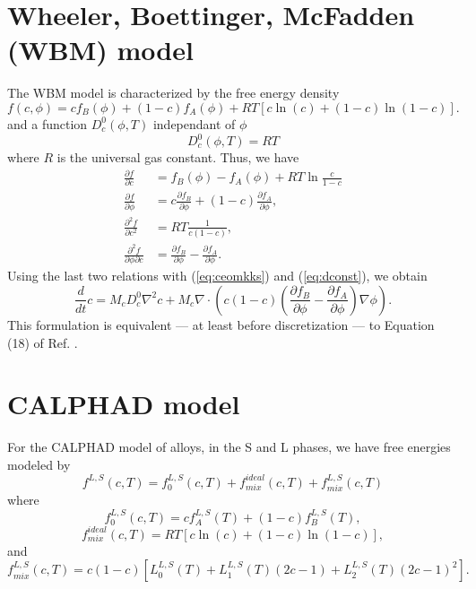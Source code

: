 %
\section{Wheeler, Boettinger, McFadden (WBM) model}

The WBM model \cite{PhysRevA.45.7424} is
characterized by the free energy density
%
\begin{equation}
  f(c,\phi)=c f_B(\phi)+(1-c)f_A(\phi)+RT[c
  \ln(c)+(1-c)\ln(1-c)].
\label{eq:fwbm}
\end{equation}
%
and a function $D_c^0(\phi,T)$ independant of $\phi$
%
\begin{equation}
  D_c^0(\phi,T)=RT
\label{eq:dconst}
\end{equation}
%
where $R$ is the universal gas constant.
Thus, we have
%
\begin{align}
  \frac{\partial f}{\partial c} & =
  f_B(\phi)-f_A(\phi)+RT\ln{\frac{c}{1-c}}
  \\
  \frac{\partial f}{\partial\phi} & =
  c\frac{\partial f_B}{\partial\phi} + (1-c)\frac{\partial
  f_A}{\partial\phi},
  \label{eq:dfdphiWBM}
  \\
  \frac{\partial^2 f}{\partial c^2} & =
  RT\frac{1}{c(1-c)},
  \label{eq:d2fdc2WBM}
  \\
  \frac{\partial^2 f}{\partial\phi\partial c}
  & = \frac{\partial f_B}{\partial\phi} -\frac{\partial
  f_A}{\partial\phi}.
  \label{eq:dfdcdphiWBM} 
\end{align}
%
Using the last two relations with (\ref{eq:ceomkks}) and (\ref{eq:dconst}),
we obtain
%
\begin{equation}
  \frac{d}{dt}c=M_c D_c^0\nabla^2 c + M_c \nabla\cdot\left(
  c(1-c)\left(\frac{\partial f_B}{\partial\phi} -\frac{\partial
  f_A}{\partial\phi}\right)\nabla\phi\right).
\label{eq:ctWBM}
\end{equation}
%
This formulation is equivalent --- at least before discretization
--- to Equation (18) of Ref. \cite{PhysRevA.45.7424}.

%
\section{CALPHAD model}

For the CALPHAD model of alloys, in the S and L phases, we have free energies
modeled by
%
\begin{equation}
  f^{L,S}(c,T)= f_0^{L,S}(c,T)+f_{mix}^{ideal}(c,T)+f^{L,S}_{mix}(c,T)
\end{equation}
%
where
%
\begin{equation}
  f_0^{L,S}(c,T)=c f_A^{L,S}(T)+(1-c)f_B^{L,S}(T),
\end{equation}
%
\begin{equation}
  f_{mix}^{ideal}(c,T)=
  RT[c\ln(c)+(1-c)\ln(1-c)],
\end{equation}
%
and
%
\begin{equation}
  f^{L,S}_{mix}(c,T)=c(1-c)[L_0^{L,S}(T)+L_1^{L,S}(T)(2c-1)+L_2^{L,S}(T)(2c-1)^2].
\end{equation}


